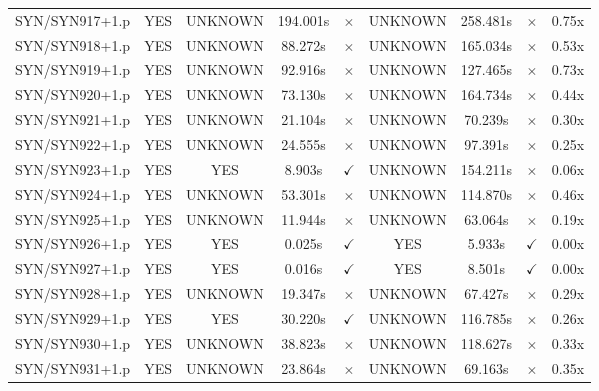 \documentclass[a4paper,10pt]{article}
\begin{document}
\begin{longtable}{lcccccccc}
SYN/SYN917+1.p & YES & UNKNOWN & 194.001s & \cellcolor{mismatchcolor}$\times$ & UNKNOWN & 258.481s & \cellcolor{mismatchcolor}$\times$ & 0.75x \\
SYN/SYN918+1.p & YES & UNKNOWN & 88.272s & \cellcolor{mismatchcolor}$\times$ & UNKNOWN & 165.034s & \cellcolor{mismatchcolor}$\times$ & 0.53x \\
SYN/SYN919+1.p & YES & UNKNOWN & 92.916s & \cellcolor{mismatchcolor}$\times$ & UNKNOWN & 127.465s & \cellcolor{mismatchcolor}$\times$ & 0.73x \\
SYN/SYN920+1.p & YES & UNKNOWN & 73.130s & \cellcolor{mismatchcolor}$\times$ & UNKNOWN & 164.734s & \cellcolor{mismatchcolor}$\times$ & 0.44x \\
SYN/SYN921+1.p & YES & UNKNOWN & 21.104s & \cellcolor{mismatchcolor}$\times$ & UNKNOWN & 70.239s & \cellcolor{mismatchcolor}$\times$ & 0.30x \\
SYN/SYN922+1.p & YES & UNKNOWN & 24.555s & \cellcolor{mismatchcolor}$\times$ & UNKNOWN & 97.391s & \cellcolor{mismatchcolor}$\times$ & 0.25x \\
SYN/SYN923+1.p & YES & YES & 8.903s & \cellcolor{matchcolor}$\checkmark$ & UNKNOWN & 154.211s & \cellcolor{mismatchcolor}$\times$ & 0.06x \\
SYN/SYN924+1.p & YES & UNKNOWN & 53.301s & \cellcolor{mismatchcolor}$\times$ & UNKNOWN & 114.870s & \cellcolor{mismatchcolor}$\times$ & 0.46x \\
SYN/SYN925+1.p & YES & UNKNOWN & 11.944s & \cellcolor{mismatchcolor}$\times$ & UNKNOWN & 63.064s & \cellcolor{mismatchcolor}$\times$ & 0.19x \\
SYN/SYN926+1.p & YES & YES & 0.025s & \cellcolor{matchcolor}$\checkmark$ & YES & 5.933s & \cellcolor{matchcolor}$\checkmark$ & 0.00x \\
SYN/SYN927+1.p & YES & YES & 0.016s & \cellcolor{matchcolor}$\checkmark$ & YES & 8.501s & \cellcolor{matchcolor}$\checkmark$ & 0.00x \\
SYN/SYN928+1.p & YES & UNKNOWN & 19.347s & \cellcolor{mismatchcolor}$\times$ & UNKNOWN & 67.427s & \cellcolor{mismatchcolor}$\times$ & 0.29x \\
SYN/SYN929+1.p & YES & YES & 30.220s & \cellcolor{matchcolor}$\checkmark$ & UNKNOWN & 116.785s & \cellcolor{mismatchcolor}$\times$ & 0.26x \\
SYN/SYN930+1.p & YES & UNKNOWN & 38.823s & \cellcolor{mismatchcolor}$\times$ & UNKNOWN & 118.627s & \cellcolor{mismatchcolor}$\times$ & 0.33x \\
SYN/SYN931+1.p & YES & UNKNOWN & 23.864s & \cellcolor{mismatchcolor}$\times$ & UNKNOWN & 69.163s & \cellcolor{mismatchcolor}$\times$ & 0.35x \\

\end{longtable}
\end{document}
